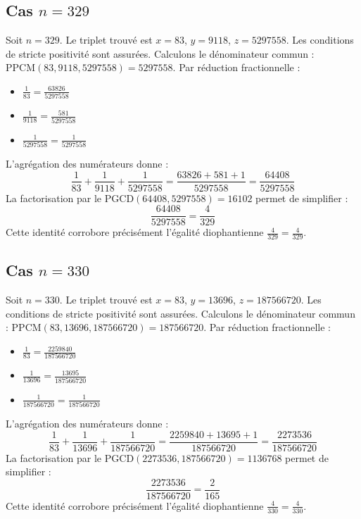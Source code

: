 \documentclass[11pt,a4paper]{article}
\begin{document}
\subsection{Cas $n = 329$}
Soit $n = 329$. Le triplet trouvé est $x = 83$, $y = 9118$, $z = 5297558$.
Les conditions de stricte positivité sont assurées.
Calculons le dénominateur commun : $\text{PPCM}(83, 9118, 5297558) = 5297558$.
Par réduction fractionnelle :
\begin{itemize}
    \item $\frac{1}{83} = \frac{63826}{5297558}$
    \item $\frac{1}{9118} = \frac{581}{5297558}$
    \item $\frac{1}{5297558} = \frac{1}{5297558}$
\end{itemize}
L'agrégation des numérateurs donne :
$$ \frac{1}{83} + \frac{1}{9118} + \frac{1}{5297558} = \frac{63826 + 581 + 1}{5297558} = \frac{64408}{5297558} $$
La factorisation par le $\text{PGCD}(64408, 5297558) = 16102$ permet de simplifier :
$$ \frac{64408}{5297558} = \frac{4}{329} $$
Cette identité corrobore précisément l'égalité diophantienne $\frac{4}{329} = \frac{4}{329}$.

\subsection{Cas $n = 330$}
Soit $n = 330$. Le triplet trouvé est $x = 83$, $y = 13696$, $z = 187566720$.
Les conditions de stricte positivité sont assurées.
Calculons le dénominateur commun : $\text{PPCM}(83, 13696, 187566720) = 187566720$.
Par réduction fractionnelle :
\begin{itemize}
    \item $\frac{1}{83} = \frac{2259840}{187566720}$
    \item $\frac{1}{13696} = \frac{13695}{187566720}$
    \item $\frac{1}{187566720} = \frac{1}{187566720}$
\end{itemize}
L'agrégation des numérateurs donne :
$$ \frac{1}{83} + \frac{1}{13696} + \frac{1}{187566720} = \frac{2259840 + 13695 + 1}{187566720} = \frac{2273536}{187566720} $$
La factorisation par le $\text{PGCD}(2273536, 187566720) = 1136768$ permet de simplifier :
$$ \frac{2273536}{187566720} = \frac{2}{165} $$
Cette identité corrobore précisément l'égalité diophantienne $\frac{4}{330} = \frac{4}{330}$.
\end{document}
